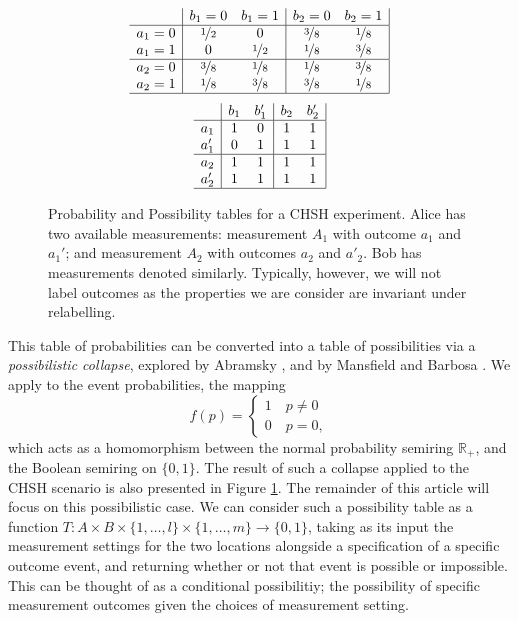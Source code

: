 \documentclass[reprint]{revtex4-1}
\theoremstyle{definition}
\begin{document}
\begin{figure}
\begin{equation*}
\begin{array}{c| c c | c c |}
&b_1=0&b_1=1&b_2=0&b_2=1\\ \hline
a_1=0&\nicefrac{1}{2} &0  & \nicefrac{3}{8} & \nicefrac{1}{8}\\
a_1=1&0&\nicefrac{1}{2}  &\nicefrac{1}{8} &\nicefrac{3}{8} \\ \hline
a_2=0&\nicefrac{3}{8}&\nicefrac{1}{8} &\nicefrac{1}{8} &\nicefrac{3}{8}  \\
a_2=1&\nicefrac{1}{8}&\nicefrac{3}{8} &\nicefrac{3}{8} & \nicefrac{1}{8} \\ \hline
\end{array} \end{equation*}\begin{equation*}
\begin{array}{c| c c | c c |}
&b_1&b_1'&b_2&b'_2\\ \hline
a_1&1 &0  &1 & 1\\
a_1'&0&1  &1 &1\\ \hline
a_2&1&1&1 &1 \\
a_2'&1&1 &1 &1 \\ \hline
\end{array} 
\end{equation*}
\caption{Probability and Possibility tables for a CHSH \cite{CHSH1969} experiment. Alice has two available measurements: measurement $A_1$ with outcome $a_1$ and $a_1'$; and measurement $A_2$ with outcomes $a_2$ and $a'_2$. Bob has measurements denoted similarly. Typically, however, we will not label outcomes as the properties we are consider are invariant under relabelling.}
\label{CHSH}
\end{figure}

This table of probabilities can be converted into a table of possibilities via a \emph{possibilistic collapse}, explored by Abramsky \cite{Abra2013-2}, and by Mansfield and Barbosa \cite{Mans2014}. We apply to the event probabilities, the mapping
\begin{equation}
f(p)=\begin{cases} 1 \quad p\neq 0 \\ 0 \quad p=0, \end{cases}
\end{equation}
which acts as a homomorphism between the normal probability semiring $\mathbb{R}_+$, and the Boolean semiring on $\{0,1\}$. The result of such a collapse applied to the CHSH scenario is also presented in Figure \ref{CHSH}. The remainder of this article will focus on this possibilistic case. We can consider such a possibility table as a function $T:A\times B \times \{1,\dots, l\}\times \{1,\dots, m\}\rightarrow\{0,1\}$, taking as its input the measurement settings for the two locations alongside a specification of a specific outcome event, and returning whether or not that event is possible or impossible. This can be thought of as a conditional possibilitiy; the possibility of specific measurement outcomes given the choices of measurement setting.
\end{document}

